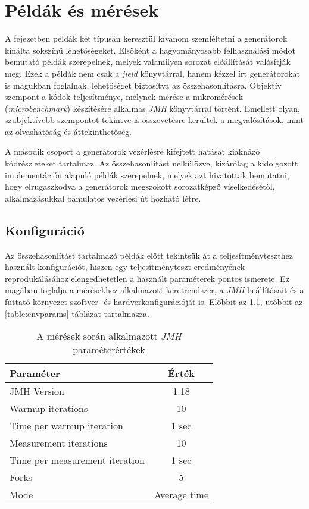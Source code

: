 \chapter{Példák és mérések}\label{ch:peldakEsMeresek}

A fejezetben példák két típusán keresztül kívánom szemléltetni a generátorok kínálta sokszínű lehetőségeket. Elsőként a hagyományosabb felhasználási módot bemutató példák szerepelnek, melyek valamilyen sorozat előállítását valósítják meg. Ezek a példák nem csak a \textit{jield} könyvtárral, hanem kézzel írt generátorokat is magukban foglalnak, lehetőséget biztosítva az összehasonlításra. Objektív szempont a kódok teljesítménye, melynek mérése a mikromérések (\textit{microbenchmark}) készítésére alkalmas \textit{JMH} könyvtárral történt. Emellett olyan, szubjektívebb szempontot tekintve is összevetésre kerültek a megvalósítások, mint az olvashatóság és áttekinthetőség.

A második csoport a generátorok vezérlésre kifejtett hatását kiaknázó kódrészleteket tartalmaz. Az összehasonlítást nélkülözve, kizárólag a kidolgozott implementáción alapuló példák szerepelnek, melyek azt hivatottak bemutatni, hogy elrugaszkodva a generátorok megszokott sorozatképző viselkedésétől, alkalmazásukkal bámulatos vezérlési út hozható létre.

\section{Konfiguráció}

Az összehasonlítást tartalmazó példák előtt tekintsük át a teljesítményteszthez használt konfigurációt, hiszen egy teljesítményteszt eredményének reprodukálásához elengedhetetlen a használt paraméterek pontos ismerete. Ez magában foglalja a mérésekhez alkalmazott keretrendszer, a \textit{JMH} beállításait és a futtató környezet szoftver- és hardverkonfigurációját is. Előbbit az \ref{table:jmhparams}, utóbbit az \ref{table:envparams} táblázat tartalmazza.

\begin{table}[h]
\captionsetup{justification=centering}
\centering
  \begin{tabular}{|| l | c ||}
  \hline
  Paraméter & Érték \\
  \hline \hline
  JMH Version                        & 1.18 \\
  \hline
  Warmup iterations                  & 10 \\
  Time per warmup iteration          & 1 sec \\
  \hline
  Measurement iterations             & 10 \\
  Time per measurement iteration     & 1 sec \\
  \hline
  Forks                              & 5 \\
  \hline                               
  Mode                               & Average time \\
  \hline
  \end{tabular}
\caption{A mérések során alkalmazott \textit{JMH} paraméterértékek}  
\label{table:jmhparams}
\end{table}

